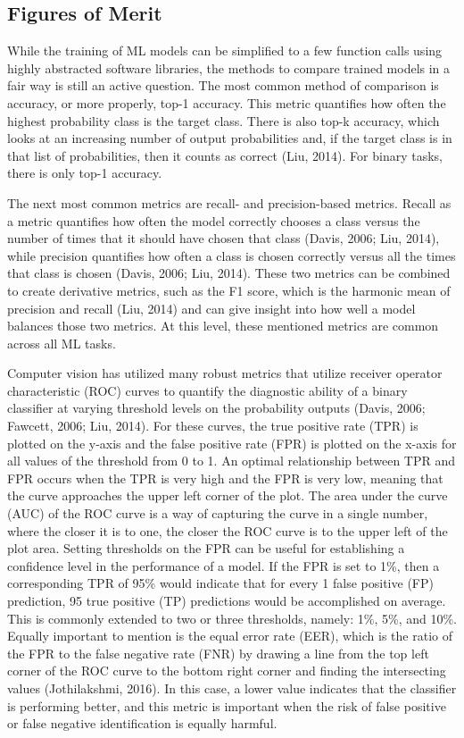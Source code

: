 \documentclass[12pt]{iopart}
\begin{document}
\subsection*{Figures of Merit}

While the training of ML models can be simplified to a few function calls using highly abstracted software libraries, the methods to compare trained models in a fair way is still an active question.  The most common method of comparison is accuracy, or more properly, top-1 accuracy.  This metric quantifies how often the highest probability class is the target class.  There is also top-k accuracy, which looks at an increasing number of output probabilities and, if the target class is in that list of probabilities, then it counts as correct (Liu, 2014).  For binary tasks, there is only top-1 accuracy.  

The next most common metrics are recall- and precision-based metrics.  Recall as a metric quantifies how often the model correctly chooses a class versus the number of times that it should have chosen that class (Davis, 2006; Liu, 2014), while precision quantifies how often a class is chosen correctly versus all the times that class is chosen (Davis, 2006; Liu, 2014).  These two metrics can be combined to create derivative metrics, such as the F1 score, which is the harmonic mean of precision and recall (Liu, 2014) and can give insight into how well a model balances those two metrics.  At this level, these mentioned metrics are common across all ML tasks.  

Computer vision has utilized many robust metrics that utilize receiver operator characteristic (ROC) curves to quantify the diagnostic ability of a binary classifier at varying threshold levels on the probability outputs (Davis, 2006; Fawcett, 2006; Liu, 2014).  For these curves, the true positive rate (TPR) is plotted on the y-axis and the false positive rate (FPR) is plotted on the x-axis for all values of the threshold from 0 to 1.  An optimal relationship between TPR and FPR occurs when the TPR is very high and the FPR is very low, meaning that the curve approaches the upper left corner of the plot.  The area under the curve (AUC) of the ROC curve is a way of capturing the curve in a single number, where the closer it is to one, the closer the ROC curve is to the upper left of the plot area.  Setting thresholds on the FPR can be useful for establishing a confidence level in the performance of a model.  If the FPR is set to 1\%, then a corresponding TPR of 95\% would indicate that for every 1 false positive (FP) prediction, 95 true positive (TP) predictions would be accomplished on average.  This is commonly extended to two or three thresholds, namely: 1\%, 5\%, and 10\%.  Equally important to mention is the equal error rate (EER), which is the ratio of the FPR to the false negative rate (FNR) by drawing a line from the top left corner of the ROC curve to the bottom right corner and finding the intersecting values (Jothilakshmi, 2016).  In this case, a lower value indicates that the classifier is performing better, and this metric is important when the risk of false positive or false negative identification is equally harmful.
 
\end{document}
